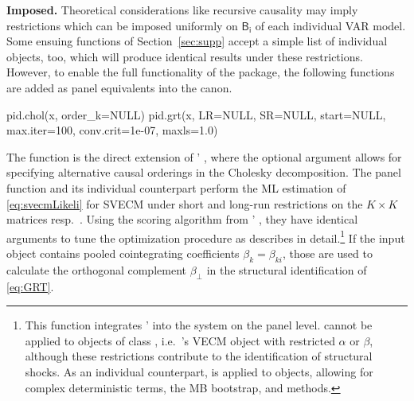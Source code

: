 \textbf{Imposed.} Theoretical considerations like recursive causality may imply restrictions which can be imposed uniformly on $ \mathsf{{B}_i} $ of each individual VAR model. Some ensuing functions of Section~\ref{sec:supp} accept a simple list of individual  objects, too, which will produce identical results under these restrictions. However, to enable the full functionality of the  package, the following functions are added as panel equivalents into the  canon. 
\begin{CodeChunk}
\begin{CodeInput}
pid.chol(x, order_k=NULL)
pid.grt(x, LR=NULL, SR=NULL, start=NULL, max.iter=100, conv.crit=1e-07, maxls=1.0)
\end{CodeInput}
\end{CodeChunk}
The function  is the direct extension of ' , where the optional argument  allows for specifying alternative causal orderings in the Cholesky decomposition. The panel function  and its individual counterpart perform the ML estimation of \eqref{eq:svecmLikeli} for SVECM under short and long-run restrictions on the $ K \times K $ matrices  resp.~. Using the scoring algorithm from ' , they have identical arguments to tune the optimization procedure as \citet[Sec.~3.2]{Pfaff2008a} describes in detail.\footnote{This function integrates '  into the  system on the panel level.  cannot be applied to objects of class , i.e.~'s VECM object with restricted $ \alpha $ or $ \beta $, although these restrictions contribute to the identification of structural shocks. As an individual counterpart,  is applied to  objects, allowing for complex deterministic terms, the MB bootstrap, and  methods.} If the input object  contains pooled cointegrating coefficients $ \beta_k=\beta_{ki} $, those are used to calculate the orthogonal complement $ \beta_{\perp} $ in the structural identification of \eqref{eq:GRT}.


